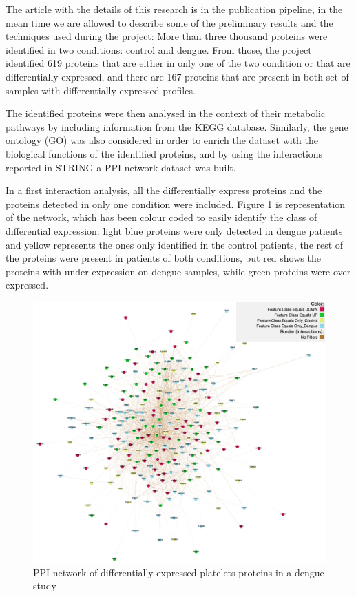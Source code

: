 The article with the details of this research is in the publication pipeline, in the mean time we are allowed to describe some of the preliminary results and the techniques used during the project: More than three thousand proteins were identified in two conditions: control and dengue. From those, the project identified 619 proteins that are either in only one of the two condition or that are differentially expressed, and there are 167 proteins that are present in both set of samples with differentially expressed profiles.

The identified proteins were then analysed in the context of their metabolic pathways by including information from the KEGG database. Similarly, the gene ontology (GO) was also considered in order to enrich the dataset with the biological functions of the identified proteins, and by using the interactions reported in STRING a PPI network dataset was built.

In a first interaction analysis, all the differentially express proteins and the proteins detected in only one condition were included. Figure \ref{fig:pinv_platelets_1} is representation of the network, which has been colour coded to easily identify the class of differential expression: light blue proteins were only detected in dengue patients and yellow represents the ones only identified in the control patients, the rest of the proteins were present in patients of both conditions, but red shows the proteins with under expression on dengue samples, while green proteins were over expressed.

\begin{figure}
\centering
\includegraphics[width=\textwidth]{figures/pinv_platelets_1.png}
\caption[PPI network of differentially expressed platelets proteins in a dengue study.]{PPI network of differentially expressed platelets proteins in a dengue study
\label{fig:pinv_platelets_1}}
\end{figure}

